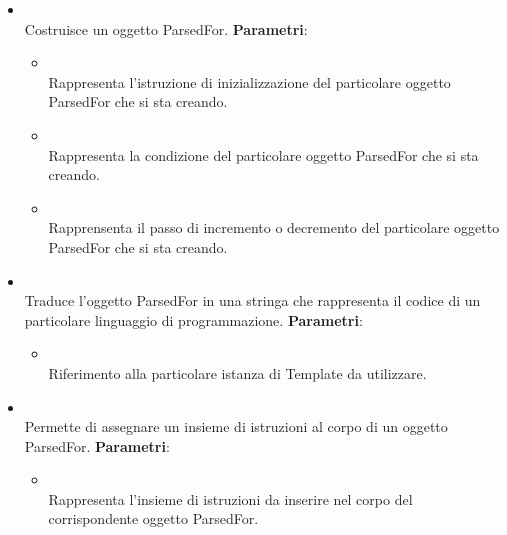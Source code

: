 \begin{itemize}
\begin{itemize}
\item {}
\\ Costruisce un oggetto ParsedFor.
\textbf{Parametri}:
\begin{itemize}
\item {}
\\ Rappresenta l'istruzione di inizializzazione del particolare oggetto ParsedFor che si sta creando.
\item {}
\\ Rappresenta la condizione del particolare oggetto ParsedFor che si sta creando.

\item {}
\\ Rapprensenta il passo di incremento o decremento del particolare oggetto ParsedFor che si sta creando.
\end{itemize}
\item {}
\\ Traduce l'oggetto ParsedFor in una stringa che rappresenta il codice di un particolare linguaggio di programmazione.
\textbf{Parametri}:
\begin{itemize}
\item {}
\\ Riferimento alla particolare istanza di Template da utilizzare.
\end{itemize}
\item {}
\\ Permette di assegnare un insieme di istruzioni al corpo di un oggetto ParsedFor.
\textbf{Parametri}:
\begin{itemize}
\item {}
\\ Rappresenta l'insieme di istruzioni da inserire nel corpo del corrispondente oggetto ParsedFor.
\end{itemize}
\end{itemize}
\end{itemize}

